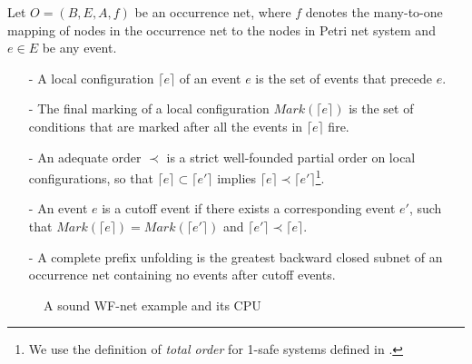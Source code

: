 \documentclass{llncs}
\begin{document}
\begin{definition}\label{def:cpu}
Let $O=(B,E,A,f)$ be an occurrence net, where $f$ denotes the many-to-one mapping of nodes in the occurrence net to the nodes in Petri net system and $e\in E$ be any event.
	\begin{itemize}
		\item[-] A local configuration $\lceil e\rceil$ of an event $e$ is the set of events that precede $e$.
		\item[-] The final marking of a local configuration $Mark(\lceil e\rceil)$ is the set of conditions that are marked after all the events in $\lceil e\rceil$ fire.
		\item[-] An adequate order $\prec$ is a strict well-founded partial order on local configurations, so that $\lceil e\rceil\subset\lceil e'\rceil$ implies $\lceil e\rceil\prec\lceil e'\rceil$\footnote{We use the definition of \emph{total order} for 1-safe systems defined in \cite{esparza2002improvement}.}.
		\item[-] An event $e$ is a cutoff event if there exists a corresponding event $e'$, such that $Mark(\lceil e\rceil)=Mark(\lceil e'\rceil)$ and $\lceil e'\rceil\prec\lceil e\rceil$.
		\item[-] A complete prefix unfolding is the greatest backward closed subnet of an occurrence net containing no events after cutoff events.
	\end{itemize}
\end{definition}

\begin{figure}[htbp]
\centering
{}
\caption{A sound WF-net example and its CPU\label{fig:examplePetriAndCpu}}
\end{figure}
\end{document}
